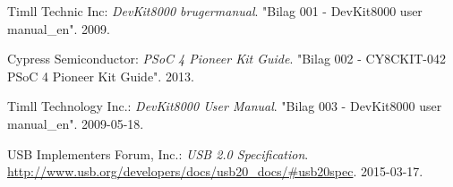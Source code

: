 \renewcommand{\bibname}{Litteraturliste}
\begin{thebibliography}{2}

 Timll Technic Inc: \textit{DevKit8000 brugermanual}. "Bilag 001 - DevKit8000 user manual\_en". 2009.

 Cypress Semiconductor: \textit{PSoC 4 Pioneer Kit Guide}. "Bilag 002 - CY8CKIT-042 PSoC 4 Pioneer Kit Guide". 2013.

 Timll Technology Inc.: \textit{DevKit8000 User Manual}. "Bilag 003 - DevKit8000 user manual\_en". 2009-05-18.

 USB Implementers Forum, Inc.: \textit{USB 2.0 Specification}. \url{http://www.usb.org/developers/docs/usb20_docs/#usb20spec}. 2015-03-17.

\end{thebibliography}